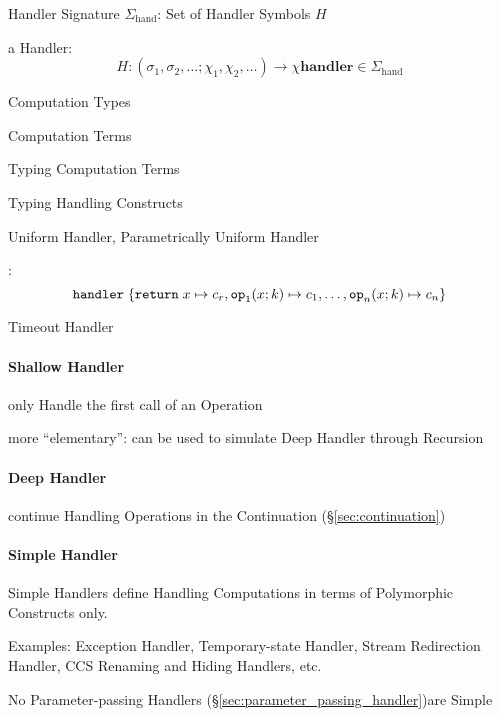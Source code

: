 Handler Signature $\Sigma_\mathrm{hand}$: Set of Handler Symbols $H$

a Handler:
\[
  H : (\sigma_1, \sigma_2, \ldots; \chi_1, \chi_2, \ldots)
    \rightarrow \chi \mathbf{handler} \in \Sigma_\mathrm{hand}
\]

Computation Types

Computation Terms

Typing Computation Terms

Typing Handling Constructs

Uniform Handler, Parametrically Uniform Handler
\cite{plotkin-pretnar09}


\cite{pretnar15}:
\[
  \mathtt{handler}\; \{ \mathtt{return}\; x
          \mapsto c_r, \mathtt{op}_1(x;k) \mapsto c_1, \ldots,
          \mathtt{op}_n(x;k) \mapsto c_n \}
\]


\asterism


Timeout Handler



\paragraph{Shallow Handler}\label{sec:shallow_handler}\hfill

only Handle the first call of an Operation

more ``elementary'': can be used to simulate Deep Handler through
Recursion \cite{pretnar15}



\paragraph{Deep Handler}\label{sec:deep_handler}\hfill

continue Handling Operations in the Continuation
(\S\ref{sec:continuation})



\paragraph{Simple Handler}\label{sec:simple_handler}\hfill
\cite{plotkin-pretnar13}

Simple Handlers define Handling Computations in terms of Polymorphic
Constructs only.

Examples: Exception Handler, Temporary-state Handler, Stream
Redirection Handler, CCS Renaming and Hiding Handlers, etc.

No Parameter-passing Handlers
(\S\ref{sec:parameter_passing_handler})are Simple

